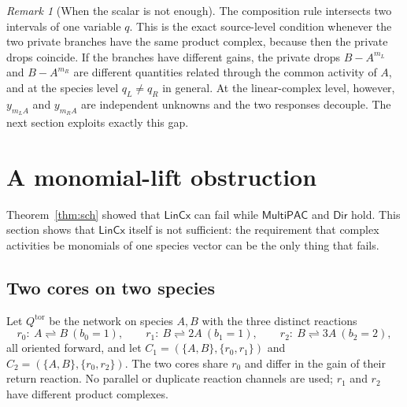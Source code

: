 \documentclass[11pt,a4paper]{article}
\theoremstyle{plain}
\theoremstyle{definition}
\theoremstyle{remark}
\newtheorem{remark}[theorem]{Remark}
\newcommand{\MPAC}{\mathsf{MultiPAC}}
\newcommand{\DIR}{\mathsf{Dir}}
\newcommand{\LIN}{\mathsf{LinCx}}
\newcommand{\rev}{\rightleftharpoons}
\begin{document}
\begin{remark}[When the scalar is not enough]\label{rem:notenough}
The composition rule intersects two intervals of one variable $q$. This is the exact source-level condition whenever the two private branches have the same product complex, because then the private drops coincide. If the branches have different gains, the private drops $B-A^{m_L}$ and $B-A^{m_R}$ are different quantities related through the common activity of $A$, and at the species level $q_L\ne q_R$ in general. At the linear-complex level, however, $y_{m_LA}$ and $y_{m_RA}$ are independent unknowns and the two responses decouple. The next section exploits exactly this gap.
\end{remark}

\section{A monomial-lift obstruction}\label{sec:toric}

Theorem~\ref{thm:sch} showed that $\LIN$ can fail while $\MPAC$ and $\DIR$ hold. This section shows that $\LIN$ itself is not sufficient: the requirement that complex activities be monomials of one species vector can be the only thing that fails.

\subsection{Two cores on two species}

Let $Q^{\mathrm{tor}}$ be the network on species $A,B$ with the three distinct reactions
\[
 r_0:\ A\rev B\ (b_0=1),\qquad r_1:\ B\rev 2A\ (b_1=1),\qquad r_2:\ B\rev 3A\ (b_2=2),
\]
all oriented forward, and let $C_1=(\{A,B\},\{r_0,r_1\})$ and $C_2=(\{A,B\},\{r_0,r_2\})$. The two cores share $r_0$ and differ in the gain of their return reaction. No parallel or duplicate reaction channels are used; $r_1$ and $r_2$ have different product complexes.
\end{document}
